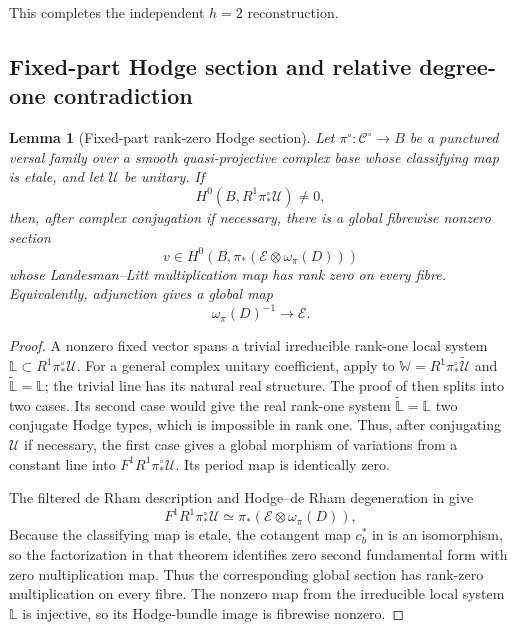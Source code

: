 \documentclass[11pt]{article}
\newtheorem{lemma}[theorem]{Lemma}
\theoremstyle{definition}
\newcommand{\Ecal}{\mathcal E}
\newcommand{\Ucal}{\mathcal U}
\begin{document}
This completes the independent $h=2$ reconstruction.

\subsection{Fixed-part Hodge section and relative degree-one contradiction}
\label{subsec:picard}

\begin{lemma}[Fixed-part rank-zero Hodge section]
\label{lem:fixed-part-hodge}
Let $\pi^\circ:\mathcal C^\circ\to B$ be a punctured versal family over a
smooth quasi-projective complex base whose classifying map is etale, and let
$\Ucal$ be unitary.  If
\[
 H^0(B,R^1\pi_*^\circ\Ucal)\ne0,
\]
then, after complex conjugation if necessary, there is a global fibrewise
nonzero section
\[
 v\in H^0\!\left(B,\pi_*(\Ecal\otimes\omega_\pi(D))\right)
\]
whose Landesman--Litt multiplication map has rank zero on every fibre.
Equivalently, adjunction gives a global map
\[
 \omega_\pi(D)^{-1}\longrightarrow\Ecal.
\]
\end{lemma}

\begin{proof}
A nonzero fixed vector spans a trivial irreducible rank-one local system
$\mathbb L\subset R^1\pi_*^\circ\Ucal$.  For a general complex unitary
coefficient, apply \cite[Proposition 4.2.2]{LLCan} to
$\mathbb W=R^1\pi_*^\circ\widetilde{\Ucal}$ and
$\widetilde{\mathbb L}=\mathbb L$; the trivial line has its natural real
structure.  The proof of
\cite[Lemma 6.1.1]{LLCan} then splits into two cases.  Its second case would
give the real rank-one system $\widetilde{\mathbb L}=\mathbb L$ two conjugate
Hodge types, which is impossible in rank one.  Thus, after conjugating
$\Ucal$ if necessary, the first case gives a global morphism of variations
from a constant line into $F^1R^1\pi_*^\circ\Ucal$.  Its period map is
identically zero.

The filtered de Rham description and Hodge--de Rham degeneration in
\cite[Theorem 4.1.1]{LLCan} give
\[
 F^1R^1\pi_*^\circ\Ucal\simeq
 \pi_*(\Ecal\otimes\omega_\pi(D)),
\]
Because the classifying map is etale, the cotangent map $c_b^*$ in
\cite[Theorem 5.1.6]{LLCan} is an isomorphism, so the factorization in that
theorem identifies zero second fundamental form with zero multiplication
map.  Thus the corresponding global section has
rank-zero multiplication on every fibre.  The nonzero map from the
irreducible local system $\mathbb L$ is injective, so its Hodge-bundle image is
fibrewise nonzero.
\end{proof}
\end{document}
